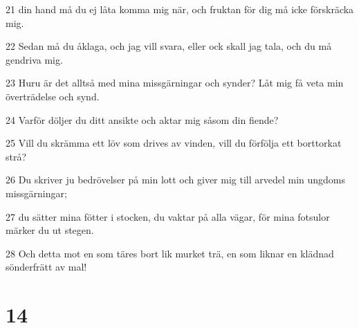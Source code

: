 \par 21 din hand må du ej låta komma mig när, och fruktan för dig må icke förskräcka mig.
\par 22 Sedan må du åklaga, och jag vill svara, eller ock skall jag tala, och du må gendriva mig.
\par 23 Huru är det alltså med mina missgärningar och synder? Låt mig få veta min överträdelse och synd.
\par 24 Varför döljer du ditt ansikte och aktar mig såsom din fiende?
\par 25 Vill du skrämma ett löv som drives av vinden, vill du förfölja ett borttorkat strå?
\par 26 Du skriver ju bedrövelser på min lott och giver mig till arvedel min ungdoms missgärningar;
\par 27 du sätter mina fötter i stocken, du vaktar på alla vägar, för mina fotsulor märker du ut stegen.
\par 28 Och detta mot en som täres bort lik murket trä, en som liknar en klädnad sönderfrätt av mal!

\chapter{14}

